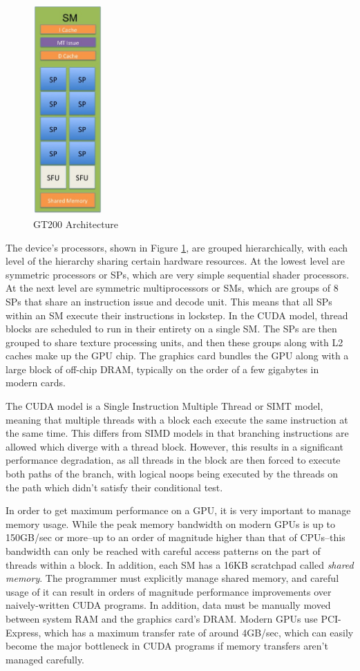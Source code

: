 \documentclass[preprint]{sigplanconf}
\begin{document}
\begin{figure}
\includegraphics[height=80mm]{GPUdiagram1.jpg}
\caption{GT200 Architecture}
\label{GPUdiagram}
\end{figure}

The device's processors, shown in Figure \ref{GPUdiagram}, are grouped hierarchically, with each level of the hierarchy sharing certain hardware resources.  At the lowest level are symmetric processors or SPs, which are very simple sequential shader processors.  At the next level are symmetric multiprocessors or SMs, which are groups of 8 SPs that share an instruction issue and decode unit.  This means that all SPs within an SM execute their instructions in lockstep.  In the CUDA model, thread blocks are scheduled to run in their entirety on a single SM.  The SPs are then grouped to share texture processing units, and then these groups along with L2 caches make up the GPU chip.  The graphics card bundles the GPU along with a large block of off-chip DRAM, typically on the order of a few gigabytes in modern cards.

The CUDA model is a Single Instruction Multiple Thread or SIMT model, meaning that multiple threads with a block each execute the same instruction at the same time.  This differs from SIMD models in that branching instructions are allowed which diverge with a thread block.  However, this results in a significant performance degradation, as all threads in the block are then forced to execute both paths of the branch, with logical noops being executed by the threads on the path which didn't satisfy their conditional test.

In order to get maximum performance on a GPU, it is very important to manage memory usage.  While the peak memory bandwidth on modern GPUs is up to 150GB/sec or more--up to an order of magnitude higher than that of CPUs--this bandwidth can only be reached with careful access patterns on the part of threads within a block.  In addition, each SM has a 16KB scratchpad called {\it shared memory}.  The programmer must explicitly manage shared memory, and careful usage of it can result in orders of magnitude performance improvements over naively-written CUDA programs.  In addition, data must be manually moved between system RAM and the graphics card's DRAM.  Modern GPUs use PCI-Express, which has a maximum transfer rate of around 4GB/sec, which can easily become the major bottleneck in CUDA programs if memory transfers aren't managed carefully.
\end{document}
